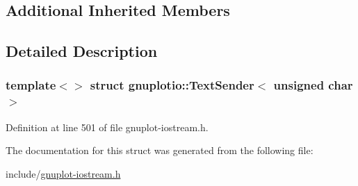 \subsection*{Additional Inherited Members}


\subsection{Detailed Description}
\subsubsection*{template$<$$>$\newline
struct gnuplotio\+::\+Text\+Sender$<$ unsigned char $>$}



Definition at line 501 of file gnuplot-\/iostream.\+h.



The documentation for this struct was generated from the following file\+:\begin{DoxyCompactItemize}
\item 
include/\hyperlink{gnuplot-iostream_8h}{gnuplot-\/iostream.\+h}\end{DoxyCompactItemize}
